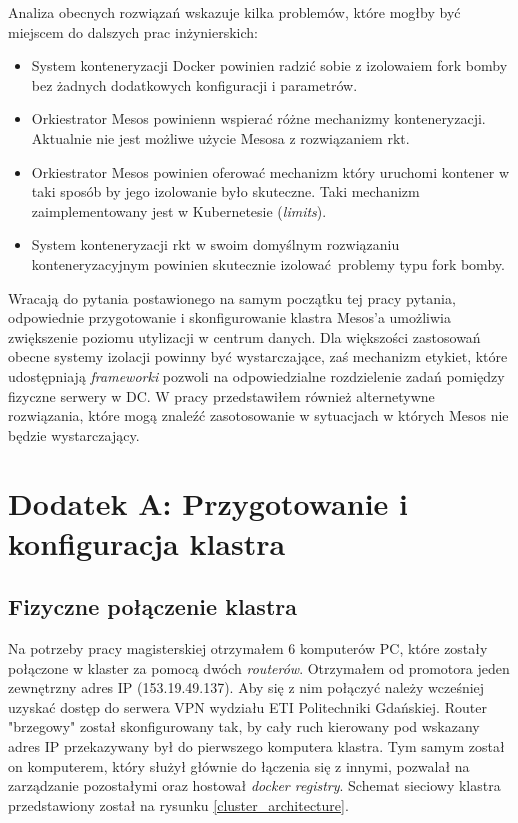\documentclass[10pt,a4paper,titlepage,twoside]{report}
\begin{document}
Analiza obecnych rozwiązań wskazuje kilka problemów, które mogłby być miejscem do dalszych prac inżynierskich:
\begin{itemize}
\item System konteneryzacji Docker powinien radzić sobie z izolowaiem fork bomby bez żadnych dodatkowych konfiguracji i parametrów.
\item Orkiestrator Mesos powinienn wspierać różne mechanizmy konteneryzacji. Aktualnie nie jest możliwe użycie Mesosa z rozwiązaniem rkt.
\item Orkiestrator Mesos powinien oferować mechanizm który uruchomi kontener w taki sposób by jego izolowanie było skuteczne. Taki mechanizm zaimplementowany jest w Kubernetesie (\textit{limits}).
\item System konteneryzacji rkt w swoim domyślnym rozwiązaniu konteneryzacyjnym powinien skutecznie izolować problemy typu fork bomby.
\end{itemize}

Wracają do pytania postawionego na samym początku tej pracy pytania, odpowiednie przygotowanie i skonfigurowanie klastra Mesos'a umożliwia zwiększenie poziomu utylizacji w centrum danych. Dla większości zastosowań obecne systemy izolacji powinny być wystarczające, zaś mechanizm etykiet, które udostępniają \textit{frameworki} pozwoli na odpowiedzialne rozdzielenie zadań pomiędzy fizyczne serwery w DC. W pracy przedstawiłem również alternetywne rozwiązania, które mogą znaleźć zasotosowanie w sytuacjach w których Mesos nie będzie wystarczający.

\newpage
\chapter{Dodatek A: Przygotowanie i konfiguracja klastra}
\section{Fizyczne połączenie klastra}

Na potrzeby pracy magisterskiej otrzymałem 6 komputerów PC, które zostały połączone w klaster za pomocą dwóch \textit{routerów}. Otrzymałem od promotora jeden zewnętrzny adres IP (153.19.49.137). Aby się z nim połączyć należy wcześniej uzyskać dostęp do serwera VPN wydziału ETI Politechniki Gdańskiej. Router "brzegowy" został skonfigurowany tak, by cały ruch kierowany pod wskazany adres IP przekazywany był do pierwszego komputera klastra. Tym samym został on komputerem, który służył głównie do łączenia się z innymi, pozwalał na zarządzanie pozostałymi oraz hostował \textit{docker registry}. Schemat sieciowy klastra przedstawiony został na rysunku \ref{cluster_architecture}.
\end{document}
